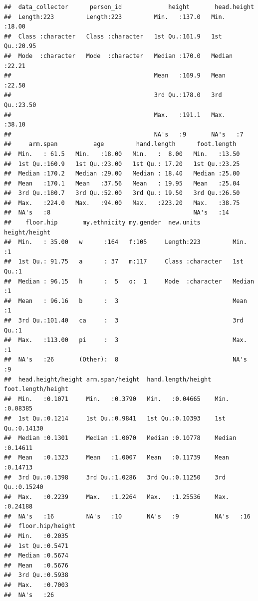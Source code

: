 \documentclass[]{article}
\begin{document}
\begin{verbatim}
##  data_collector      person_id             height       head.height   
##  Length:223         Length:223         Min.   :137.0   Min.   :18.00  
##  Class :character   Class :character   1st Qu.:161.9   1st Qu.:20.95  
##  Mode  :character   Mode  :character   Median :170.0   Median :22.21  
##                                        Mean   :169.9   Mean   :22.50  
##                                        3rd Qu.:178.0   3rd Qu.:23.50  
##                                        Max.   :191.1   Max.   :38.10  
##                                        NA's   :9       NA's   :7      
##     arm.span          age         hand.length      foot.length   
##  Min.   : 61.5   Min.   :18.00   Min.   :  8.00   Min.   :13.50  
##  1st Qu.:160.9   1st Qu.:23.00   1st Qu.: 17.20   1st Qu.:23.25  
##  Median :170.2   Median :29.00   Median : 18.40   Median :25.00  
##  Mean   :170.1   Mean   :37.56   Mean   : 19.95   Mean   :25.04  
##  3rd Qu.:180.7   3rd Qu.:52.00   3rd Qu.: 19.50   3rd Qu.:26.50  
##  Max.   :224.0   Max.   :94.00   Max.   :223.20   Max.   :38.75  
##  NA's   :8                                        NA's   :14     
##    floor.hip       my.ethnicity my.gender  new.units         height/height
##  Min.   : 35.00   w      :164   f:105     Length:223         Min.   :1    
##  1st Qu.: 91.75   a      : 37   m:117     Class :character   1st Qu.:1    
##  Median : 96.15   h      :  5   o:  1     Mode  :character   Median :1    
##  Mean   : 96.16   b      :  3                                Mean   :1    
##  3rd Qu.:101.40   ca     :  3                                3rd Qu.:1    
##  Max.   :113.00   pi     :  3                                Max.   :1    
##  NA's   :26       (Other):  8                                NA's   :9    
##  head.height/height arm.span/height  hand.length/height foot.length/height
##  Min.   :0.1071     Min.   :0.3790   Min.   :0.04665    Min.   :0.08385   
##  1st Qu.:0.1214     1st Qu.:0.9841   1st Qu.:0.10393    1st Qu.:0.14130   
##  Median :0.1301     Median :1.0070   Median :0.10778    Median :0.14611   
##  Mean   :0.1323     Mean   :1.0007   Mean   :0.11739    Mean   :0.14713   
##  3rd Qu.:0.1398     3rd Qu.:1.0286   3rd Qu.:0.11250    3rd Qu.:0.15240   
##  Max.   :0.2239     Max.   :1.2264   Max.   :1.25536    Max.   :0.24188   
##  NA's   :16         NA's   :10       NA's   :9          NA's   :16        
##  floor.hip/height
##  Min.   :0.2035  
##  1st Qu.:0.5471  
##  Median :0.5674  
##  Mean   :0.5676  
##  3rd Qu.:0.5938  
##  Max.   :0.7003  
##  NA's   :26
\end{verbatim}
\end{document}
